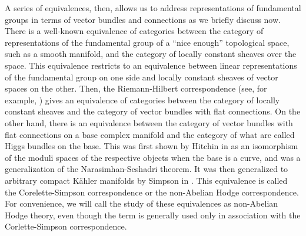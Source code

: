 \documentclass[11pt]{amsart}
\begin{document}
A series of equivalences, then, allows us to address representations of
fundamental groups in terms of vector bundles and connections as we briefly
discuss now.  There is a well-known equivalence of categories between the
category of representations of the fundamental group of a ``nice enough''
topological space, such as a smooth manifold, and the category of locally
constant sheaves over the space. This equivalence restricts to an equivalence
between linear representations of the fundamental group on one side and locally
constant sheaves of vector spaces on the other. Then, the Riemann-Hilbert
correspondence (see, for example, \cite[35]{LanglandsIntro}) gives an
equivalence of categories between the category of locally constant sheaves and
the category of vector bundles with flat connections.  On the other hand, there
is an equivalence between the category of vector bundles with flat connections
on a base complex manifold and the category of what are called Higgs bundles on
the base. This was first shown by Hitchin in \cite{SelfDualityEqn} as an
isomorphism of the moduli spaces of the respective objects when the base is a
curve, and was a generalization of the Narasimhan-Seshadri theorem. It was then
generalized to arbitrary compact K\"ahler manifolds by Simpson in
\cite{HiggsLocSys}. This equivalence is called the Corelette-Simpson
correspondence or the non-Abelian Hodge correspondence. For convenience, we will
call the study of these equivalences as non-Abelian Hodge theory, even though
the term is generally used only in association with the Corlette-Simpson
correspondence.
\end{document}
